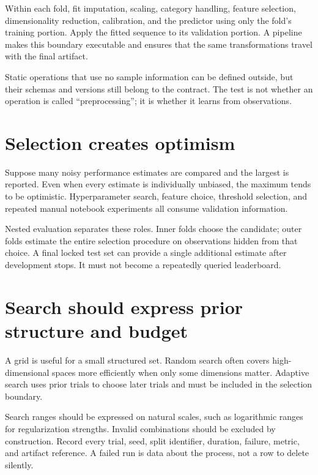 Within each fold, fit imputation, scaling, category handling, feature selection,
dimensionality reduction, calibration, and the predictor using only the fold's
training portion. Apply the fitted sequence to its validation portion. A
pipeline makes this boundary executable and ensures that the same transformations
travel with the final artifact.

Static operations that use no sample information can be defined outside, but
their schemas and versions still belong to the contract. The test is not
whether an operation is called ``preprocessing''; it is whether it learns from
observations.

\section{Selection creates optimism}

Suppose many noisy performance estimates are compared and the largest is
reported. Even when every estimate is individually unbiased, the maximum tends
to be optimistic. Hyperparameter search, feature choice, threshold selection,
and repeated manual notebook experiments all consume validation information.

Nested evaluation separates these roles. Inner folds choose the candidate;
outer folds estimate the entire selection procedure on observations hidden from
that choice. A final locked test set can provide a single additional estimate
after development stops. It must not become a repeatedly queried leaderboard.


\section{Search should express prior structure and budget}

A grid is useful for a small structured set. Random search often covers
high-dimensional spaces more efficiently when only some dimensions matter.
Adaptive search uses prior trials to choose later trials and must be included in
the selection boundary.

Search ranges should be expressed on natural scales, such as logarithmic ranges
for regularization strengths. Invalid combinations should be excluded by
construction. Record every trial, seed, split identifier, duration, failure,
metric, and artifact reference. A failed run is data about the process, not a
row to delete silently.

